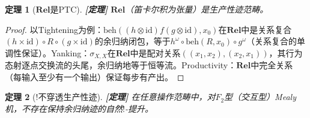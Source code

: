 \documentclass[11pt,a4paper]{article}
\newtheorem{theorem}{定理}
\newcommand{\lvl}[1]{\hfill\textbf{\footnotesize[#1]}}
\newcommand{\lvP}{\lvl{定理}}
\newcommand{\bang}{{!}}
\newcommand{\tensor}{\otimes}
\begin{document}
\begin{theorem}[$\mathbf{Rel}$是PTC]\label{thm:rel-ptc}\lvP
$\mathbf{Rel}$（笛卡尔积为张量）是生产性迹范畴。
\end{theorem}

\begin{proof}
以Tightening为例：$\mathrm{beh}((h\tensor\mathrm{id})f(g\tensor\mathrm{id}),x_0)$在$\mathbf{Rel}$中是关系复合$(h\times\mathrm{id})\circ R\circ(g\times\mathrm{id})$的余归纳闭包，等于$h^\omega\circ\mathrm{beh}(R,x_0)\circ g^\omega$（关系复合的单调性保证）。Yanking：$\sigma_{X,X}$在$\mathbf{Rel}$中是配对关系$((x_1,x_2),(x_2,x_1))$，其行为态射逐点交换流的头尾，余归纳地等于恒等流。Productivity：$\mathbf{Rel}$中完全关系（每输入至少有一个输出）保证每步有产出。
\end{proof}

\begin{theorem}[!不穿透生产性迹]\label{thm:bang-no-ptc}\lvP
在任意操作范畴中，对$F_2$型（交互型）Mealy机，不存在保持余归纳迹的自然$\bang$-提升。
\end{theorem}
\end{document}
